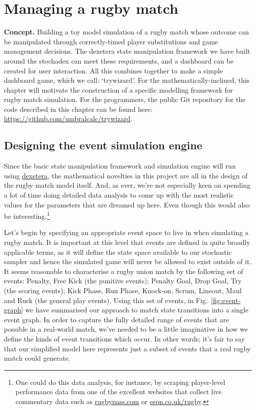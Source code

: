 \chapter{\sffamily Managing a rugby match}

{\bfseries\sffamily Concept.} Building a toy model simulation of a rugby match whose outcome can be manipulated through correctly-timed player substitutions and game management decisions. The dexetera state manipulation framework we have built around the stochadex can meet these requirements, and a dashboard can be created for user interaction. All this combines together to make a simple dashboard game, which we call: `trywizard'. For the mathematically-inclined, this chapter will motivate the construction of a specific modelling framework for rugby match simulation. For the programmers, the public Git repository for the code described in this chapter can be found here: \href{https://github.com/umbralcalc/trywizard}{https://github.com/umbralcalc/trywizard}.

\section{\sffamily Designing the event simulation engine}

Since the basic state manipulation framework and simulation engine will run using \href{https://github.com/umbralcalc/dexetera}{dexetera}, the mathematical novelties in this project are all in the design of the rugby match model itself. And, as ever, we're not especially keen on spending a lot of time doing detailed data analysis to come up with the most realistic values for the parameters that are dreamed up here. Even though this would also be interesting.\footnote{One could do this data analysis, for instance, by scraping player-level performance data from one of the excellent websites that collect live commentary data such as \href{https://www.rugbypass.com/}{rugbypass.com} or \href{https://www.espn.co.uk/rugby/}{espn.co.uk/rugby}.}

Let's begin by specifying an appropriate event space to live in when simulating a rugby match. It is important at this level that events are defined in quite broadly applicable terms, as it will define the state space available to our stochastic sampler and hence the simulated game will never be allowed to exist outside of it. It seems reasonable to characterise a rugby union match by the following set of events: Penalty, Free Kick (the punitive events); Penalty Goal, Drop Goal, Try (the scoring events); Kick Phase, Run Phase, Knock-on, Scrum, Lineout, Maul and Ruck (the general play events). Using this set of events, in Fig.~\ref{fig:event-graph} we have summarised our approach to match state transitions into a single event graph. In order to capture the fully detailed range of events that are possible in a real-world match, we've needed to be a little imaginative in how we define the kinds of event transitions which occur. In other words; it's fair to say that our simplified model here represents just a subset of events that a real rugby match could generate.

